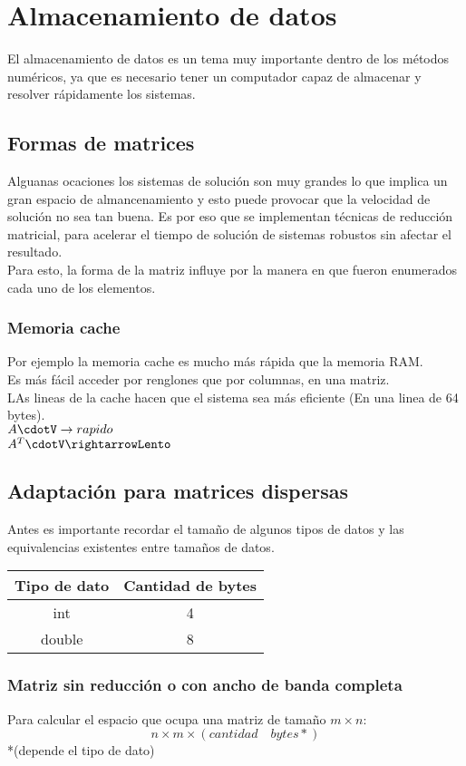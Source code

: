 \chapter{Almacenamiento de datos }
El almacenamiento de datos es un tema muy importante dentro de los m\'etodos num\'ericos, ya que es necesario tener un computador capaz de almacenar y resolver r\'apidamente los sistemas.

\section{Formas de matrices}
Alguanas ocaciones los sistemas de soluci\'on son muy grandes lo que implica un gran espacio de almancenamiento y esto puede provocar que la velocidad de soluci\'on no sea tan buena. Es por eso que se implementan t\'ecnicas de reducci\'on matricial, para acelerar el tiempo de soluci\'on de sistemas robustos sin afectar el resultado.\\
Para esto, la forma de la matriz influye por la manera en que fueron enumerados cada uno de los elementos.

\subsection{Memoria cache}
Por ejemplo la memoria cache es mucho m\'as r\'apida que la memoria RAM.\\
Es m\'as f\'acil acceder por renglones que por columnas, en una matriz.\\
LAs lineas de la cache hacen que el sistema sea más eficiente (En una linea de 64 bytes).\\
$A\cdotV \rightarrow rapido$\\
$A^T\cdotV\rightarrowLento$

\section{Adaptaci\'on para matrices dispersas}
Antes es importante recordar el tamaño de algunos tipos de datos y las equivalencias existentes entre tamaños de datos. 
\begin{tabular}{| c | c |}
\hline
Tipo de dato & Cantidad de bytes \\
\hline
int & 4 \\
double & 8\\
\hline
\end{tabular}
\subsection{Matriz sin reducci\'on o con ancho de banda completa}
Para calcular el espacio que ocupa una matriz de tamaño $m \times n$:
\begin{displaymath}
n\times m\times (cantidad\quad bytes*)
\end{displaymath}
*(depende el tipo de dato) 
